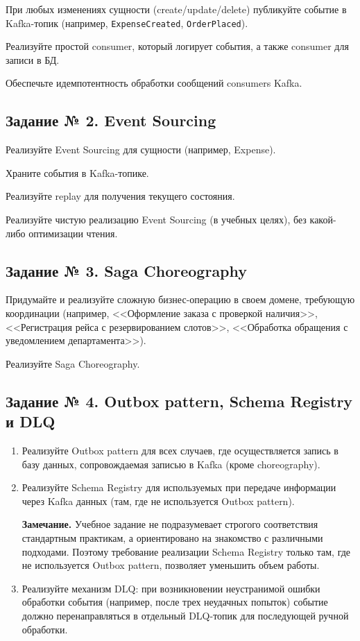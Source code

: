 \documentclass{article}
\begin{document}
При любых изменениях сущности (create/update/delete) публикуйте событие
в Kafka-топик (например, \texttt{ExpenseCreated}, \texttt{OrderPlaced}).

Реализуйте простой consumer, который логирует события, а также consumer
для записи в БД.

Обеспечьте идемпотентность обработки сообщений consumers Kafka.

\subsection{Задание № 2. Event Sourcing}

Реализуйте Event Sourcing для сущности (например, Expense).

Храните события в Kafka-топике.

Реализуйте replay для получения текущего состояния.

Реализуйте чистую реализацию Event Sourcing (в учебных целях),
без какой-либо оптимизации чтения.

\subsection{Задание № 3. Saga Choreography}

Придумайте и реализуйте сложную бизнес-операцию в своем домене,
требующую координации (например, <<Оформление заказа с проверкой наличия>>,
<<Регистрация рейса с резервированием слотов>>,
<<Обработка обращения с уведомлением департамента>>).

Реализуйте Saga Choreography.

\subsection{Задание № 4. Outbox pattern, Schema Registry и DLQ}

\begin{enumerate}

    \item
    Реализуйте Outbox pattern для всех случаев, где осуществляется запись
    в базу данных, сопровождаемая записью в Kafka (кроме choreography).

    \item
    Реализуйте Schema Registry для используемых при передаче информации
    через Kafka данных (там, где не используется Outbox pattern).

    \textbf{Замечание.}
    Учебное задание не подразумевает строгого соответствия стандартным
    практикам, а ориентировано на знакомство с различными подходами.
    Поэтому требование реализации Schema Registry только там, где
    не используется Outbox pattern, позволяет уменьшить объем работы.

    \item
    Реализуйте механизм DLQ: при возникновении неустранимой ошибки обработки
    события (например, после трех неудачных попыток) событие должно
    перенаправляться в отдельный DLQ-топик для последующей ручной обработки.

\end{enumerate}
\end{document}
